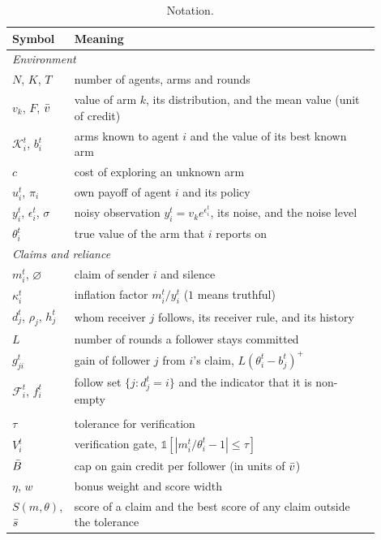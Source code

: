 \begin{table}[t]
  \caption{Notation.}
  \label{tab:notation}
  \centering
  \small
  \begin{tabular}{p{0.13\linewidth}p{0.77\linewidth}}
    \toprule
    Symbol & Meaning \\
    \midrule
    \multicolumn{2}{l}{\emph{Environment}} \\
    $N$, $K$, $T$ & number of agents, arms and rounds \\
    $v_k$, $F$, $\bar v$ & value of arm $k$, its distribution, and the mean value (unit of credit) \\
    $\mathcal K_i^t$, $b_i^t$ & arms known to agent $i$ and the value of its best known arm \\
    $c$ & cost of exploring an unknown arm \\
    $u_i^t$, $\pi_i$ & own payoff of agent $i$ and its policy \\
    $y_i^t$, $\epsilon_i^t$, $\sigma$ & noisy observation $y_i^t=v_ke^{\epsilon_i^t}$, its noise, and the noise level \\
    $\theta_i^t$ & true value of the arm that $i$ reports on \\
    \midrule
    \multicolumn{2}{l}{\emph{Claims and reliance}} \\
    $m_i^t$, $\varnothing$ & claim of sender $i$ and silence \\
    $\kappa_i^t$ & inflation factor $m_i^t/y_i^t$ ($1$ means truthful) \\
    $d_j^t$, $\rho_j$, $h_j^t$ & whom receiver $j$ follows, its receiver rule, and its history \\
    $L$ & number of rounds a follower stays committed \\
    $g_{ji}^t$ & gain of follower $j$ from $i$'s claim, $L(\theta_i^t-b_j^t)^+$ \\
    $\mathcal F_i^t$, $f_i^t$ & follow set $\{j:d_j^t=i\}$ and the indicator that it is non-empty \\
    \midrule
    \multicolumn{2}{l}{\emph{\tvc{}}} \\
    $\tau$ & tolerance for verification \\
    $V_i^t$ & verification gate, $\mathbb 1[|m_i^t/\theta_i^t-1|\le\tau]$ \\
    $\bar B$ & cap on gain credit per follower (in units of $\bar v$) \\
    $\eta$, $w$ & bonus weight and score width \\
    $S(m,\theta)$, $\bar s$ & score of a claim and the best score of any claim outside the tolerance \\

\end{tabular}
\end{table}
